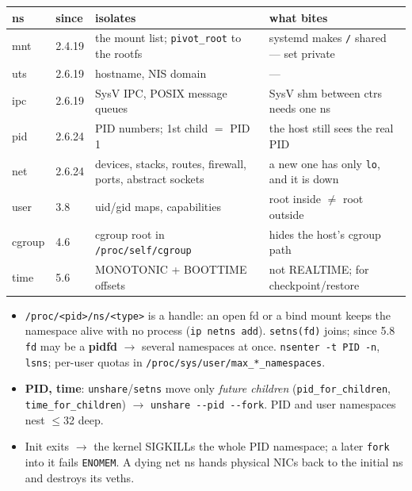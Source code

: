 \documentclass[8pt]{extarticle}
\newcommand\ct[1]{\texttt{#1}}
\newcommand\dd{\hbox{-}\hbox{-}}
\newcommand\hd[1]{\par\vspace{2pt}\noindent{\small\bfseries\color{sheetBlue}#1}\par\vspace{1pt}}
\begin{document}
\begin{multicols}{2}
\raggedright
\footnotesize{}

\hd{The 8 namespaces}
{\scriptsize\setlength\tabcolsep{2pt}
\begin{tabular}{@{}>{\ttfamily}L{7.5mm}L{7.5mm}L{30mm}L{31mm}@{}}
\toprule
\textrm{\textbf{ns}} & \textbf{since} & \textbf{isolates} & \textbf{what bites}\\
\midrule
mnt & 2.4.19 & the mount list; \ct{pivot\_root} to the rootfs & systemd makes \ct{/} shared — set private\\
uts & 2.6.19 & hostname, NIS domain & —\\
ipc & 2.6.19 & SysV IPC, POSIX message queues & SysV shm between ctrs needs one ns\\
pid & 2.6.24 & PID numbers; 1st child $=$ PID 1 & the host still sees the real PID\\
net & 2.6.24 & devices, stacks, routes, firewall, ports, abstract sockets & a new one has only \ct{lo}, and it is down\\
user & 3.8 & uid/gid maps, capabilities & root inside $\neq$ root outside\\
cgroup & 4.6 & cgroup root in \ct{/proc/self/cgroup} & hides the host's cgroup path\\
time & 5.6 & MONOTONIC + BOOTTIME offsets & not REALTIME; for checkpoint/restore\\
\bottomrule
\end{tabular}}
\begin{itemize}
  \item \ct{/proc/<pid>/ns/<type>} is a handle: an open fd or a bind mount keeps the namespace
        alive with no process (\ct{ip netns add}). \ct{setns(fd)} joins; since 5.8 \ct{fd} may be
        a \textbf{pidfd} $\to$ several namespaces at once. \ct{nsenter -t PID -n}, \ct{lsns};
        per-user quotas in \ct{/proc/sys/user/max\_*\_namespaces}.
  \item \textbf{PID, time}: \ct{unshare}/\ct{setns} move only \emph{future children}
        (\ct{pid\_for\_children}, \ct{time\_for\_children}) $\to$ \ct{unshare \dd pid \dd fork}.
        PID and user namespaces nest $\le$32 deep.
  \item Init exits $\to$ the kernel SIGKILLs the whole PID namespace; a later \ct{fork} into it
        fails \ct{ENOMEM}. A dying net ns hands physical NICs back to the initial ns and destroys
        its veths.
\end{itemize}


\end{multicols}
\end{document}
